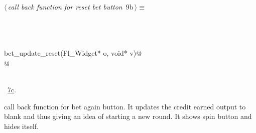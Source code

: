 \documentclass{article}
\renewcommand{\NWtarget}[2]{\hypertarget{#1}{#2}}
\renewcommand{\NWlink}[2]{\hyperlink{#1}{#2}}
\begin{document}
\begin{flushleft} \small
\begin{minipage}{\linewidth}\label{scrap14}\raggedright\small
\NWtarget{nuweb9b}{} $\langle\,${\it call back function for reset bet button}\nobreak\ {\footnotesize {9b}}$\,\rangle\equiv$
\vspace{-1ex}
\begin{list}{}{} \item
\mbox{}\verb@@\\
\mbox{}\verb@@\\
\mbox{}\verb@@\\
\mbox{}\verb@void bet_update_reset(Fl_Widget* o, void* v)@\\
\mbox{}@\\
\mbox{}\verb@@\\
\mbox{}\verb@@{\NWsep}
\end{list}
\vspace{-1.5ex}
\footnotesize
\begin{list}{}{\setlength{\itemsep}{-\parsep}\setlength{\itemindent}{-\leftmargin}}
\item \NWtxtMacroRefIn\ \NWlink{nuweb7c}{7c}.

\item{}
\end{list}
\end{minipage}\vspace{4ex}
\end{flushleft}
call back function for bet again button. It updates the credit earned output to blank and thus giving an idea of starting a new round. It shows spin button and hides itself.
\end{document}
